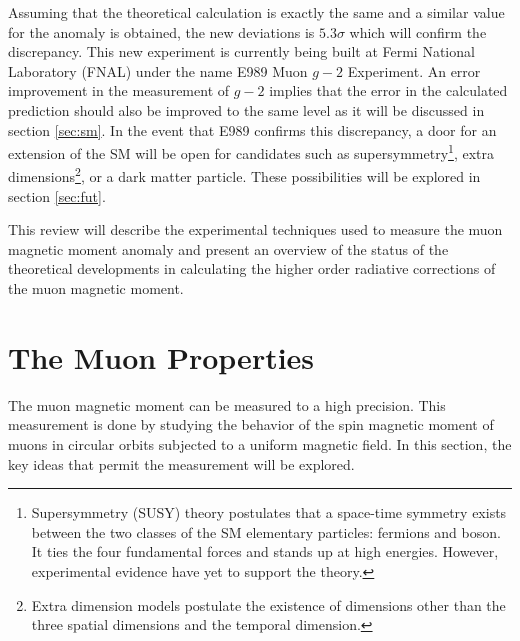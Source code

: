 \documentclass{outhesis}
\begin{document}
Assuming that the theoretical calculation is exactly the same and a similar value for the anomaly is obtained, the new deviations is $5.3\sigma$ which will confirm the discrepancy. This new experiment is currently being built at Fermi National Laboratory (FNAL) under the name E989 Muon $g-2$ Experiment. An error improvement in the measurement of $g-2$ implies that the error in the calculated prediction should also be improved to the same level as it will be discussed in section \ref{sec:sm}.
In the event that E989 confirms this discrepancy, a door for an extension of the SM will be open for candidates such as supersymmetry\footnote{Supersymmetry (SUSY) theory postulates that a space-time symmetry exists between the two classes of the SM elementary particles: fermions and boson. It ties the four fundamental forces and stands up at high energies. However, experimental evidence have yet to support the theory.}, extra dimensions\footnote{Extra dimension models postulate the existence of dimensions other than the three spatial dimensions and the temporal dimension.}, or a dark matter particle. These possibilities will be explored in section \ref{sec:fut}.

This review will describe the experimental techniques used to measure the muon magnetic moment anomaly and present an overview of the status of the theoretical developments in calculating the higher order radiative corrections of the muon magnetic moment.  


\section{The Muon Properties}

The muon magnetic moment can be measured to a high precision. This measurement is done by studying the behavior of the spin magnetic moment of muons in circular orbits subjected to a uniform magnetic field. In this section, the key ideas that permit the measurement will be explored. 
\end{document}
